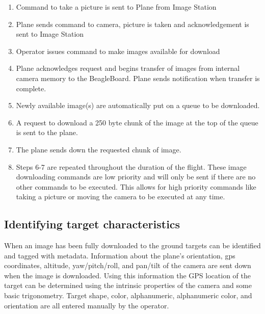 \documentclass[pdftex,10pt,letter]{article}
\begin{document}
\begin{enumerate}
\item Command to take a picture is sent to Plane from Image Station
\item Plane sends command to camera, picture is taken and acknowledgement is sent to Image Station
\item Operator issues command to make images available for download
\item Plane acknowledges request and begins transfer of images from internal camera memory to the BeagleBoard.  Plane sends notification when transfer is complete.
\item Newly available image(s) are automatically put on a queue to be downloaded.
\item A request to download a 250 byte chunk of the image at the top of the queue is sent to the plane.
\item The plane sends down the requested chunk of image.
\item Steps 6-7 are repeated throughout the duration of the flight.  These image downloading commands are low priority and will only be sent if there are no other commands to be executed. This allows for high priority commands like taking a picture or moving the camera to be executed at any time.
\end{enumerate}

\subsection{Identifying target characteristics}

When an image has been fully downloaded to the ground targets can be identified and tagged with metadata.  Information about the plane's orientation, gps coordinates, altitude, yaw/pitch/roll, and pan/tilt of the camera are sent down when the image is downloaded.  Using this information the GPS location of the target can be determined using the intrinsic properties of the camera and some basic trigonometry. Target shape, color, alphanumeric, alphanumeric color, and orientation are all entered manually by the operator.
\end{document}
